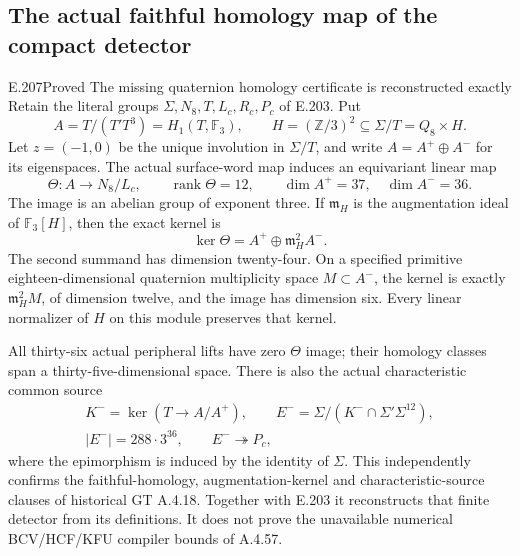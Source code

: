 \subsection{The actual faithful homology map of the compact detector}

\begin{result}{E.207}{Proved}
{The missing quaternion homology certificate is reconstructed exactly}
Retain the literal groups $\Sigma,N_8,T,L_c,R_c,P_c$ of E.203.
Put
\[
 A=T/(T'T^3)=H_1(T,\mathbb F_3),\qquad
 H=(\mathbb Z/3)^2\subseteq\Sigma/T=Q_8\times H.
\]
Let $z=(-1,0)$ be the unique involution in $\Sigma/T$, and
write $A=A^+\oplus A^-$ for its eigenspaces.  The actual
surface-word map induces an equivariant linear map
\[
 \Theta:A\longrightarrow N_8/L_c,\qquad
 \operatorname{rank}\Theta=12,\qquad
 \dim A^+=37,\quad\dim A^-=36.                                  \tag{E.207.1}
\]
The image is an abelian group of exponent three.  If
$\mathfrak m_H$ is the augmentation ideal of $\mathbb F_3[H]$,
then the exact kernel is
\[
                 \ker\Theta=A^+\oplus\mathfrak m_H^2A^-.
                                                                    \tag{E.207.2}
\]
The second summand has dimension twenty-four.  On a specified
primitive eighteen-dimensional quaternion multiplicity space
$M\subset A^-$, the kernel is exactly $\mathfrak m_H^2M$,
of dimension twelve, and the image has dimension six.
Every linear normalizer of $H$ on this module preserves that
kernel.

All thirty-six actual peripheral lifts have zero $\Theta$ image;
their homology classes span a thirty-five-dimensional space.
There is also the actual characteristic common source
\[
 \begin{gathered}
 K^- =\ker(T\longrightarrow A/A^+),\qquad
 E^- =\Sigma/(K^-\cap\Sigma'\Sigma^{12}),\\
 |E^-|=288\cdot3^{36},\qquad E^-\twoheadrightarrow P_c,
 \end{gathered}                                                   \tag{E.207.3}
\]
where the epimorphism is induced by the identity of $\Sigma$.
This independently confirms the faithful-homology,
augmentation-kernel and characteristic-source clauses of
historical GT A.4.18.  Together with E.203 it reconstructs that
finite detector from its definitions.  It does not prove the
unavailable numerical BCV/HCF/KFU compiler bounds of A.4.57.
\end{result}

